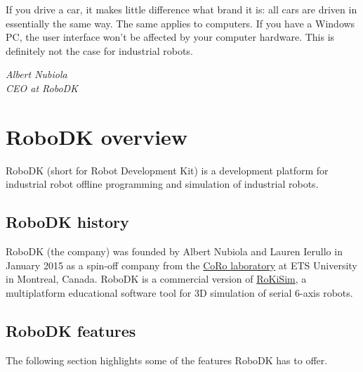 \epigraph{If you drive a car, it makes little difference what brand it is: all cars are driven
in essentially the same way. The same applies to computers. If you have a
Windows PC, the user interface won’t be affected by your computer hardware.
This is definitely not the case for industrial robots.}{\textit{Albert Nubiola \\ CEO at RoboDK}}

\section{RoboDK overview}

RoboDK (short for Robot Development Kit) is a development platform for industrial robot offline programming and simulation of industrial robots.

\subsection{RoboDK history}

RoboDK (the company) was founded by Albert Nubiola and Lauren Ierullo in January 2015 as a spin-off company from the \href{https://en.etsmtl.ca/unites-de-recherche/coro/accueil?lang=en-CA}{CoRo laboratory}   at ETS University in Montreal, Canada. RoboDK is a commercial version of \href{https://www.parallemic.org/RoKiSim.html}{RoKiSim}, a multiplatform educational software tool for 3D simulation of serial 6-axis robots.

\subsection{RoboDK features}


The following section highlights some of the features RoboDK has to offer. 


